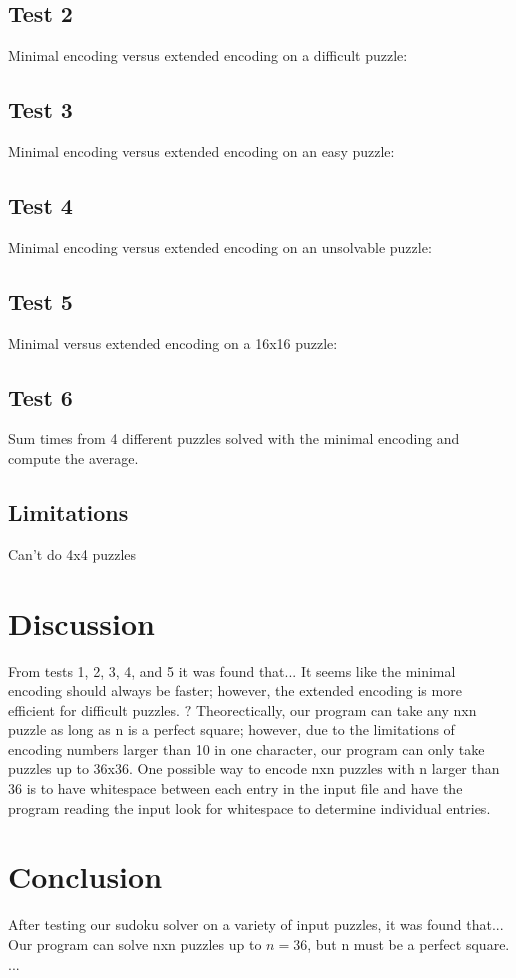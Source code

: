 \documentclass[conference,final]{IEEEtran}
\begin{document}
\subsection{Test 2}
Minimal encoding versus extended encoding on a difficult puzzle:


\subsection{Test 3}
Minimal encoding versus extended encoding on an easy puzzle:

\subsection{Test 4}
Minimal encoding versus extended encoding on an unsolvable puzzle:

\subsection{Test 5}
Minimal versus extended encoding on a 16x16 puzzle:

\subsection{Test 6}
Sum times from 4 different puzzles solved with the minimal encoding and compute the average.



\subsection{Limitations}
Can't do 4x4 puzzles

\section{Discussion}
From tests 1, 2, 3, 4, and 5 it was found that...
It seems like the minimal encoding should always be faster; however, the extended encoding is more efficient for difficult
puzzles. \(?\)
Theorectically, our program can take any nxn puzzle as long as n is a perfect square; however, due to the limitations 
of encoding numbers larger than 10 in one character, our program can only take puzzles up to 36x36. One possible way to
encode nxn puzzles with n larger than 36 is to have whitespace between each entry in the input file and have the
program reading the input look for whitespace to determine individual entries.

\section{Conclusion}
After testing our sudoku solver on a variety of input puzzles, it was found that...
Our program can solve nxn puzzles up to $n=36$, but n must be a perfect square.
...
\end{document}
